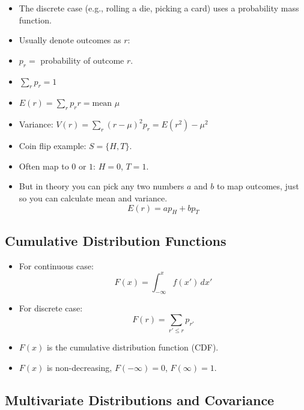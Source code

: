 \begin{itemize}
    \item The discrete case (e.g., rolling a die, picking a card) uses a probability mass function.
    \item Usually denote outcomes as $r$:
    \item $p_r =$ probability of outcome $r$.
    \item $\sum_r p_r = 1$
    \item $E(r) = \sum_r p_r r = \text{mean } \mu$
    \item Variance: $ V(r) = \sum_r (r-\mu)^2 p_r = E(r^2) - \mu^2$
    \item Coin flip example: $S = \{H, T\}$.
    \item Often map to $0$ or $1$: $H = 0$, $T = 1$.
    \item But in theory you can pick any two numbers $a$ and $b$ to map outcomes, just so you can calculate mean and variance.
          \[ E(r) = ap_H + bp_T \]
\end{itemize}

\subsection{Cumulative Distribution Functions}

\begin{itemize}
    \item For continuous case:
          \[ F(x) = \int_{-\infty}^{x} f(x') \, dx' \]
    \item For discrete case:
          \[ F(r) = \sum_{r' \leq r} p_{r'} \]
    \item $F(x)$ is the cumulative distribution function (CDF).
    \item $F(x)$ is non-decreasing, $F(-\infty) = 0$, $F(\infty) = 1$.
\end{itemize}

\subsection{Multivariate Distributions and Covariance}


